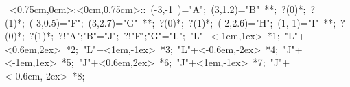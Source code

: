 %


\hbox{
\xy    <0.75cm,0cm>:<0cm,0.75cm>::
       (-3,-1 )="A"; (3,1.2)="B" **\dir{-}; ?(0)*\dir{<}; ?(1)*\dir{>};
       (-3,0.5)="F"; (3,2.7)="G" **\dir{-}; ?(0)*\dir{<}; ?(1)*\dir{>};
       (-2,2.6)="H"; (1,-1)="I" **\dir{-}; ?(0)*\dir{<}; ?(1)*\dir{>};
        ?!{"A";"B"}="J";   ?!{"F";"G"}="L";
       "L"+<-1em,1ex> *{1};
       "L"+<0.6em,2ex> *{2};
       "L"+<1em,-1ex> *{3};
       "L"+<-0.6em,-2ex> *{4};
       "J"+<-1em,1ex> *{5};
       "J"+<0.6em,2ex> *{6};
       "J"+<1em,-1ex> *{7};
       "J"+<-0.6em,-2ex> *{8};
\endxy}

